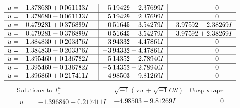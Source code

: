 \documentclass[1p]{elsarticle_modified}
\theoremstyle{definition}
\newcommand{\I}{\sqrt{-1}}
\begin{document}
$$\begin{array}{c|c|c}
\begin{aligned}
u &= \phantom{-}1.378680 + 0.061133 I\end{aligned}
 & -5.19429 - 2.37699 I & \phantom{-0.000000 } 0 \\ \hline\begin{aligned}
u &= \phantom{-}1.378680 - 0.061133 I\end{aligned}
 & -5.19429 + 2.37699 I & \phantom{-0.000000 } 0 \\ \hline\begin{aligned}
u &= \phantom{-}0.479281 + 0.376899 I\end{aligned}
 & -0.51645 + 3.54279 I & -3.97592 - 2.38269 I \\ \hline\begin{aligned}
u &= \phantom{-}0.479281 - 0.376899 I\end{aligned}
 & -0.51645 - 3.54279 I & -3.97592 + 2.38269 I \\ \hline\begin{aligned}
u &= \phantom{-}1.384830 + 0.203376 I\end{aligned}
 & -3.94332 - 4.47861 I & \phantom{-0.000000 } 0 \\ \hline\begin{aligned}
u &= \phantom{-}1.384830 - 0.203376 I\end{aligned}
 & -3.94332 + 4.47861 I & \phantom{-0.000000 } 0 \\ \hline\begin{aligned}
u &= \phantom{-}1.395460 + 0.136782 I\end{aligned}
 & -5.14352 - 2.78940 I & \phantom{-0.000000 } 0 \\ \hline\begin{aligned}
u &= \phantom{-}1.395460 - 0.136782 I\end{aligned}
 & -5.14352 + 2.78940 I & \phantom{-0.000000 } 0 \\ \hline\begin{aligned}
u &= -1.396860 + 0.217411 I\end{aligned}
 & -4.98503 + 9.81269 I & \phantom{-0.000000 } 0\\
 \hline 
 \end{array}$$\newpage$$\begin{array}{c|c|c}  
\text{Solutions to }I^u_{1}& \I (\text{vol} + \sqrt{-1}CS) & \text{Cusp shape}\\
 \hline 
\begin{aligned}
u &= -1.396860 - 0.217411 I\end{aligned}
 & -4.98503 - 9.81269 I & \phantom{-0.000000 } 0 \\ \hline\begin{aligned}

\end{aligned}
\end{array}$$
\end{document}

